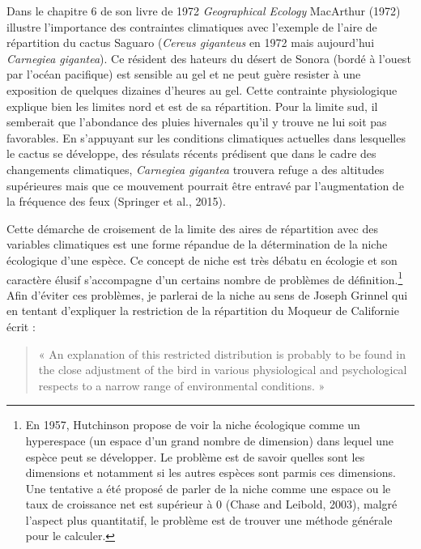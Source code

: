 Dans le chapitre 6 de son livre de 1972 \emph{Geographical Ecology}
MacArthur (1972) illustre l'importance des contraintes climatiques avec
l'exemple de l'aire de répartition du cactus Saguaro (\emph{Cereus
giganteus} en 1972 mais aujourd'hui \emph{Carnegiea gigantea}). Ce
résident des hateurs du désert de Sonora (bordé à l'ouest par l'océan
pacifique) est sensible au gel et ne peut guère resister à une
exposition de quelques dizaines d'heures au gel. Cette contrainte
physiologique explique bien les limites nord et est de sa répartition.
Pour la limite sud, il semberait que l'abondance des pluies hivernales
qu'il y trouve ne lui soit pas favorables. En s'appuyant sur les
conditions climatiques actuelles dans lesquelles le cactus se développe,
des résulats récents prédisent que dans le cadre des changements
climatiques, \emph{Carnegiea gigantea} trouvera refuge a des altitudes
supérieures mais que ce mouvement pourrait être entravé par
l'augmentation de la fréquence des feux (Springer et al., 2015).

Cette démarche de croisement de la limite des aires de répartition avec
des variables climatiques est une forme répandue de la détermination de
la niche écologique d'une espèce. Ce concept de niche est très débatu en
écologie et son caractère élusif s'accompagne d'un certains nombre de
problèmes de définition.\footnote{En 1957, Hutchinson propose de voir la
  niche écologique comme un hyperespace (un espace d'un grand nombre de
  dimension) dans lequel une espèce peut se développer. Le problème est
  de savoir quelles sont les dimensions et notamment si les autres
  espèces sont parmis ces dimensions. Une tentative a été proposé de
  parler de la niche comme une espace ou le taux de croissance net est
  supérieur à 0 (Chase and Leibold, 2003), malgré l'aspect plus
  quantitatif, le problème est de trouver une méthode générale pour le
  calculer.} Afin d'éviter ces problèmes, je parlerai de la niche au
sens de Joseph Grinnel qui en tentant d'expliquer la restriction de la
répartition du Moqueur de Californie écrit :

\begin{quote}
« An explanation of this restricted distribution is probably to be found
in the close adjustment of the bird in various physiological and
psychological respects to a narrow range of environmental conditions. »
\end{quote}

